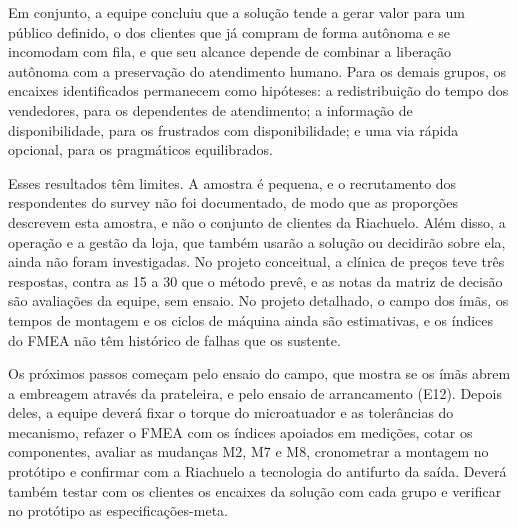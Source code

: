 Em conjunto, a equipe concluiu que a solução tende a gerar valor para um público definido, o dos clientes que já compram de forma autônoma e se incomodam com fila, e que seu alcance depende de combinar a liberação autônoma com a preservação do atendimento humano. Para os demais grupos, os encaixes identificados permanecem como hipóteses: a redistribuição do tempo dos vendedores, para os dependentes de atendimento; a informação de disponibilidade, para os frustrados com disponibilidade; e uma via rápida opcional, para os pragmáticos equilibrados.

Esses resultados têm limites. A amostra é pequena, e o recrutamento dos respondentes do survey não foi documentado, de modo que as proporções descrevem esta amostra, e não o conjunto de clientes da Riachuelo. Além disso, a operação e a gestão da loja, que também usarão a solução ou decidirão sobre ela, ainda não foram investigadas. No projeto conceitual, a clínica de preços teve três respostas, contra as 15 a 30 que o método prevê, e as notas da matriz de decisão são avaliações da equipe, sem ensaio. No projeto detalhado, o campo dos ímãs, os tempos de montagem e os ciclos de máquina ainda são estimativas, e os índices do FMEA não têm histórico de falhas que os sustente.

Os próximos passos começam pelo ensaio do campo, que mostra se os ímãs abrem a embreagem através da prateleira, e pelo ensaio de arrancamento (E12). Depois deles, a equipe deverá fixar o torque do microatuador e as tolerâncias do mecanismo, refazer o FMEA com os índices apoiados em medições, cotar os componentes, avaliar as mudanças M2, M7 e M8, cronometrar a montagem no protótipo e confirmar com a Riachuelo a tecnologia do antifurto da saída. Deverá também testar com os clientes os encaixes da solução com cada grupo e verificar no protótipo as especificações-meta.
